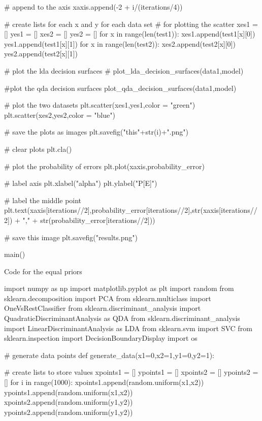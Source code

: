\documentclass{article}
\begin{document}
{\begin{python}
			# append to the axis
			xaxis.append(-2 + i/(iterations/4))
	
			# create lists for each x and y for each data set
			# for plotting the scatter
			xes1 = []
			yes1 = []
			xes2 = []
			yes2 = []
			for x in range(len(test1)):
				xes1.append(test1[x][0])
				yes1.append(test1[x][1])
			for x in range(len(test2)):
				xes2.append(test2[x][0])
				yes2.append(test2[x][1])
			
			# plot the lda decision surfaces
			# plot_lda_decision_surfaces(data1,model)
			
			#plot the qda decision surfaces
			plot_qda_decision_surfaces(data1,model)
	
			# plot the two datasets
			plt.scatter(xes1,yes1,color = "green")
			plt.scatter(xes2,yes2,color = "blue")
	
			# save the plots as images
			plt.savefig("this"+str(i)+".png")
	
			# clear plots
			plt.cla()
		
		# plot the probability of errors
		plt.plot(xaxis,probability_error)
	
		# label axis
		plt.xlabel("alpha")
		plt.ylabel("P[E]")
	
		# label the middle point
		plt.text(xaxis[iterations//2],probability_error[iterations//2],str(xaxis[iterations//2]) + "," + str(probability_error[iterations//2]))
		
		# save this image
		plt.savefig("results.png")
	
	
	main()
	
	
	
\end{python}

Code for the equal priors
\begin{python}
import numpy as np
import matplotlib.pyplot as plt
import random
from sklearn.decomposition import PCA
from sklearn.multiclass import OneVsRestClassifier
from sklearn.discriminant_analysis import QuadraticDiscriminantAnalysis as QDA
from sklearn.discriminant_analysis import LinearDiscriminantAnalysis as LDA
from sklearn.svm import SVC
from sklearn.inspection import DecisionBoundaryDisplay
import os

# generate data points
def generate_data(x1=0,x2=1,y1=0,y2=1):

	# create lists to store values
	xpoints1 = []
	ypoints1 = []
	xpoints2 = []
	ypoints2 = []
	for i in range(1000):
		xpoints1.append(random.uniform(x1,x2))
		ypoints1.append(random.uniform(x1,x2))
		xpoints2.append(random.uniform(y1,y2))
		ypoints2.append(random.uniform(y1,y2))
	

\end{python}}
\end{document}
